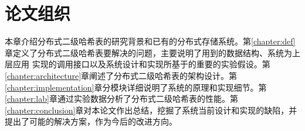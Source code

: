 \section{论文组织}
本章介绍分布式二级哈希表的研究背景和已有的分布式存储系统。第\ref{chapter:def}
章定义了分布式二级哈希表要解决的问题，主要说明了用到的数据结构、系统为上层应用
实现的调用接口以及系统设计和实现所基于的重要的实验假设。第
\ref{chapter:architecture}章阐述了分布式二级哈希表的架构设计。第
\ref{chapter:implementation}章分模块详细说明了系统的原理和实现细节。第
\ref{chapter:lab}章通过实验数据分析了分布式二级哈希表的性能。第
\ref{chapter:conclusion}章对本论文作出总结，挖掘了系统当前设计和实现的缺陷，并
提出了可能的解决方案，作为今后的改进方向。
